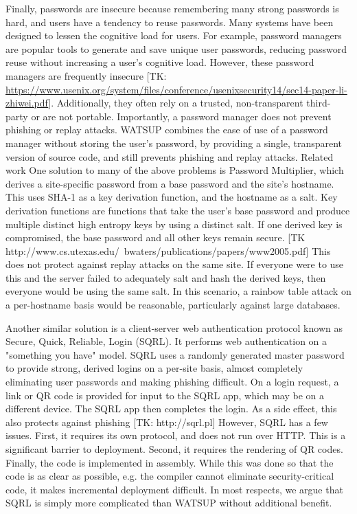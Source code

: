 Finally, passwords are insecure because remembering many strong passwords is hard, and users have a tendency to reuse passwords. Many systems have been designed to lessen the cognitive load for users. For example, password managers are popular tools to generate and save unique user passwords, reducing password reuse without increasing a user's cognitive load. However, these password managers are frequently insecure [TK: \url{https://www.usenix.org/system/files/conference/usenixsecurity14/sec14-paper-li-zhiwei.pdf}]. Additionally, they often rely on a trusted, non-transparent third-party or are not portable. Importantly, a password manager does not prevent phishing or replay attacks. WATSUP combines the ease of use of a password manager without storing the user’s password, by providing a single, transparent version of source code, and still prevents phishing and replay attacks.
Related work
One solution to many of the above problems is Password Multiplier, which derives a site-specific password from a base password and the site’s hostname. This uses SHA-1 as a key derivation function, and the hostname as a salt. Key derivation functions are functions that take the user’s base password and produce multiple distinct high entropy keys by using a distinct salt. If one derived key is compromised, the base password and all other keys remain secure. [TK http://www.cs.utexas.edu/~bwaters/publications/papers/www2005.pdf] This does not protect against replay attacks on the same site. If everyone were to use this and the server failed to adequately salt and hash the derived keys, then everyone would be using the same salt. In this scenario, a rainbow table attack on a per-hostname basis would be reasonable, particularly against large databases.

Another similar solution is a client-server web authentication protocol known as Secure, Quick, Reliable, Login (SQRL). It performs web authentication on a "something you have" model. SQRL uses a randomly generated master password to provide strong, derived logins on a per-site basis, almost completely eliminating user passwords and making phishing difficult. On a login request, a link or QR code is provided for input to the SQRL app, which may be on a different device. The SQRL app then completes the login. As a side effect, this also protects against phishing [TK: http://sqrl.pl] However, SQRL has a few issues. First, it requires its own protocol, and does not run over HTTP. This is a significant barrier to deployment. Second, it requires the rendering of QR codes. Finally, the code is implemented in assembly. While this was done so that the code is as clear as possible, e.g. the compiler cannot eliminate security-critical code, it makes incremental deployment difficult. In most respects, we argue that SQRL is simply more complicated than WATSUP without additional benefit.

